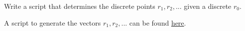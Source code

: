 Write a script that determines the discrete points $r_1, r_2, ...$ given a discrete $r_0$.

\begin{solution}
    A script to generate the vectors $r_1, r_2, ...$ can be found \href{https://gist.github.com/wsh32/23428ef4495eaf08f6cabcd5022b8781}{here}.
\end{solution}